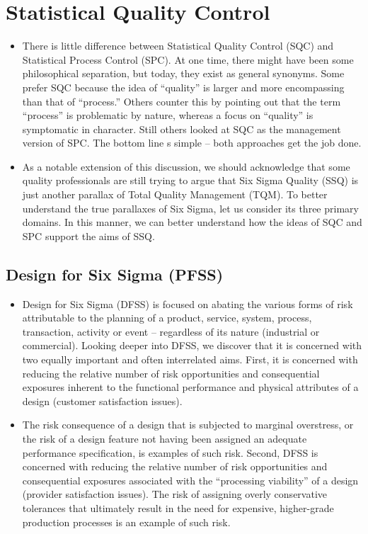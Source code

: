 \documentclass[11pt]{article} %
\begin{document}
\tableofcontents
\newpage
\large

\section{Statistical Quality Control}
\begin{itemize}
\item There is little difference between Statistical Quality Control (SQC) and Statistical Process Control (SPC).  At one time, there might have been some philosophical separation, but today, they exist as general synonyms.  Some prefer SQC because the idea of “quality” is larger and more encompassing than that of “process.”  Others counter this by pointing out that the term “process” is problematic by nature, whereas a focus on “quality” is symptomatic in character.  Still others looked at SQC as the management version of SPC.  The bottom line s simple – both approaches get the job done.

\item As a notable extension of this discussion, we should acknowledge that some quality professionals are still trying to argue that Six Sigma Quality (SSQ) is just another parallax of Total Quality Management (TQM).  To better understand the true parallaxes of Six Sigma, let us consider its three primary domains.  In this manner, we can better understand how the ideas of SQC and SPC support the aims of SSQ.
\end{itemize}


\subsection{Design for Six Sigma (PFSS)}
\begin{itemize}
\item Design for Six Sigma (DFSS) is focused on abating the various forms of risk attributable to the planning of a product, service, system, process, transaction, activity or event – regardless of its nature (industrial or commercial). Looking deeper into DFSS, we discover that it is concerned with two equally important and often interrelated aims.  First, it is concerned with reducing the relative number of risk opportunities and consequential exposures inherent to the functional performance and physical attributes of a design (customer satisfaction issues).  


\item The risk consequence of a design that is subjected to marginal overstress, or the risk of a design feature not having been assigned an adequate performance specification, is examples of such risk.  Second, DFSS is concerned with reducing the relative number of risk opportunities and consequential exposures associated with the “processing viability” of a design (provider satisfaction issues).  The risk of assigning overly conservative tolerances that ultimately result in the need for expensive, higher-grade production processes is an example of such risk.
\end{itemize}
\end{document}

